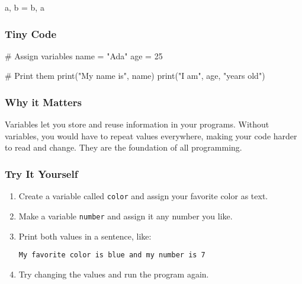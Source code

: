 \documentclass[
  letterpaper,
  DIV=11,
  numbers=noendperiod]{scrreprt}
\newenvironment{Shaded}{\begin{snugshade}}{\end{snugshade}}
\newcommand{\BuiltInTok}[1]{\textcolor[rgb]{0.00,0.23,0.31}{#1}}
\newcommand{\CommentTok}[1]{\textcolor[rgb]{0.37,0.37,0.37}{#1}}
\newcommand{\DecValTok}[1]{\textcolor[rgb]{0.68,0.00,0.00}{#1}}
\newcommand{\NormalTok}[1]{\textcolor[rgb]{0.00,0.23,0.31}{#1}}
\newcommand{\OperatorTok}[1]{\textcolor[rgb]{0.37,0.37,0.37}{#1}}
\newcommand{\StringTok}[1]{\textcolor[rgb]{0.13,0.47,0.30}{#1}}
\begin{document}
\begin{itemize}
\begin{Shaded}
\begin{Highlighting}[]
\NormalTok{a, b }\OperatorTok{=}\NormalTok{ b, a}
\end{Highlighting}
\end{Shaded}
\end{itemize}

\subsubsection{Tiny Code}\label{tiny-code-3}

\begin{Shaded}
\begin{Highlighting}[]
\CommentTok{\# Assign variables}
\NormalTok{name }\OperatorTok{=} \StringTok{"Ada"}
\NormalTok{age }\OperatorTok{=} \DecValTok{25}

\CommentTok{\# Print them}
\BuiltInTok{print}\NormalTok{(}\StringTok{"My name is"}\NormalTok{, name)}
\BuiltInTok{print}\NormalTok{(}\StringTok{"I am"}\NormalTok{, age, }\StringTok{"years old"}\NormalTok{)}
\end{Highlighting}
\end{Shaded}

\subsubsection{Why it Matters}\label{why-it-matters-3}

Variables let you store and reuse information in your programs. Without
variables, you would have to repeat values everywhere, making your code
harder to read and change. They are the foundation of all programming.

\subsubsection{Try It Yourself}\label{try-it-yourself-3}

\begin{enumerate}
\def\labelenumi{\arabic{enumi}.}
\item
  Create a variable called \texttt{color} and assign your favorite color
  as text.
\item
  Make a variable \texttt{number} and assign it any number you like.
\item
  Print both values in a sentence, like:

\begin{verbatim}
My favorite color is blue and my number is 7
\end{verbatim}
\item
  Try changing the values and run the program again.
\end{enumerate}
\end{document}
